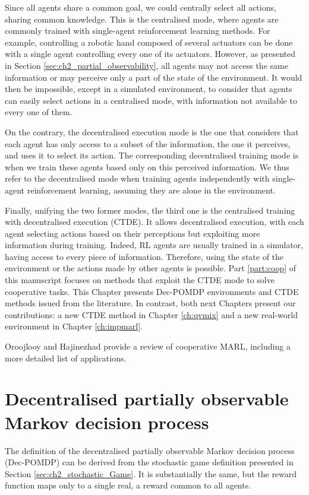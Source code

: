 Since all agents share a common goal, we could centrally select all actions, sharing common knowledge.
This is the centralised mode, where agents are commonly trained with single-agent reinforcement learning methods.
For example, controlling a robotic hand composed of several actuators can be done with a single agent controlling every one of its actuators.
However, as presented in Section \ref{sec:ch2_partial_observability}, all agents may not access the same information or may perceive only a part of the state of the environment.
It would then be impossible, except in a simulated environment, to consider that agents can easily select actions in a centralised mode, with information not available to every one of them.

On the contrary, the decentralised execution mode is the one that considers that each agent has only access to a subset of the information, the one it perceives, and uses it to select its action.
The corresponding decentralised training mode is when we train these agents based only on this perceived information.
We thus refer to the decentralised mode when training agents independently with single-agent reinforcement learning, assuming they are alone in the environment.

Finally, unifying the two former modes, the third one is the centralised training with decentralised execution (CTDE).
It allows decentralised execution, with each agent selecting actions based on their perceptions but exploiting more information during training.
Indeed, RL agents are usually trained in a simulator, having access to every piece of information.
Therefore, using the state of the environment or the actions made by other agents is possible.
Part \ref{part:coop} of this manuscript focuses on methods that exploit the CTDE mode to solve cooperative tasks.
This Chapter presents Dec-POMDP environments and CTDE methods issued from the literature. 
In contrast, both next Chapters present our contributions: a new CTDE method in Chapter \ref{ch:qvmix} and a new real-world environment in Chapter \ref{ch:impmarl}.

Oroojlooy and Hajinezhad \citep{oroojlooy2022review} provide a review of cooperative MARL, including a more detailed list of applications.

\section{Decentralised partially observable Markov decision process}
\label{sec:ch3_decpomdp}
The definition of the decentralised partially observable Markov decision process (Dec-POMDP) \citep{DecPomdp} can be derived from the stochastic game definition presented in Section \ref{sec:ch2_stochastic_Game}.
It is substantially the same, but the reward function maps only to a single real, a reward common to all agents.

